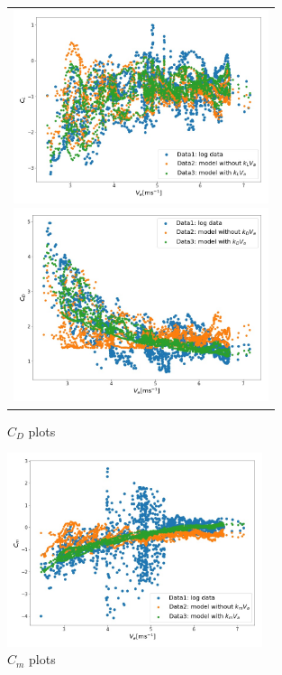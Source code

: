 \begin{figure}[htbp]
	\begin{center}
		\begin{tabular}{c}
			\begin{minipage}{0.5\hsize}
				\begin{center}
					\includegraphics[clip,width=7.5cm,bb=0 0 864 654]{./z_figure_files/chapter5/2_CL.jpeg}
					\caption{$C_L$ plots}
					\label{fig:CL_si}
				\end{center}
			\end{minipage}
			\begin{minipage}{0.5\hsize}
				\begin{center}
					\includegraphics[clip,width=7.5cm,bb=0 0 864 654]{./z_figure_files/chapter5/3_CD.jpeg}
					\caption{$C_D$ plots}
					\label{fig:CD_si}
				\end{center}
			\end{minipage}
		\end{tabular}
	\end{center}
\end{figure}
\begin{figure}[H]
  \begin{center}
    \includegraphics[clip,width=7.5cm,bb=0 0 864 654]{./z_figure_files/chapter5/4_Cm.jpeg}
    \caption{$C_m$ plots}
    \label{fig:Cm_si}
  \end{center}
\end{figure}


